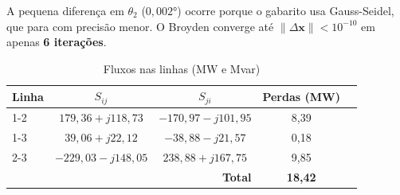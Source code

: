 \documentclass[
  12pt,
  a4paper,
  oneside,
  brazil
]{abntex2}
\begin{document}
A pequena diferença em $\theta_2$ ($0{,}002°$) ocorre porque o gabarito
usa Gauss-Seidel, que para com precisão menor. O Broyden converge até
$\|\Delta\mathbf{x}\| < 10^{-10}$ em apenas \textbf{6 iterações}.

\begin{table}[h]
  \centering
  \caption{Fluxos nas linhas (MW e Mvar)}
  \begin{tabular}{lcccc}
    \toprule
    \textbf{Linha} & $S_{ij}$ & $S_{ji}$ & \textbf{Perdas (MW)} \\
    \midrule
    1-2 & $179{,}36 + j118{,}73$ & $-170{,}97 - j101{,}95$ & 8,39  \\
    1-3 & $39{,}06  + j22{,}12$  & $-38{,}88  - j21{,}57$  & 0,18  \\
    2-3 & $-229{,}03 - j148{,}05$& $238{,}88  + j167{,}75$ & 9,85  \\
    \midrule
    \multicolumn{3}{r}{\textbf{Total}} & \textbf{18,42} \\
    \bottomrule
  \end{tabular}
\end{table}
\end{document}
